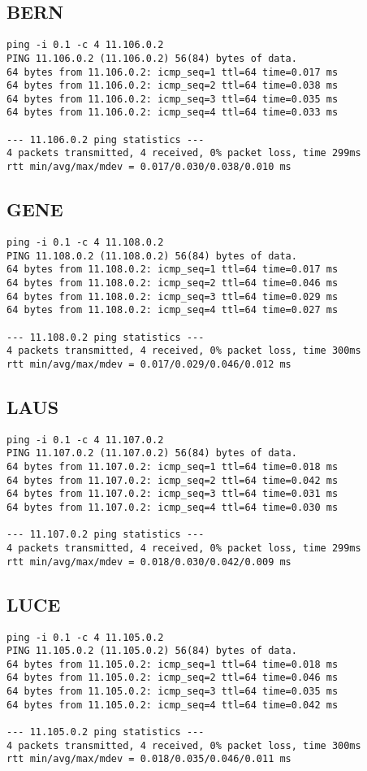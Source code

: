 \subsection{BERN}
\begin{lstlisting}
ping -i 0.1 -c 4 11.106.0.2
PING 11.106.0.2 (11.106.0.2) 56(84) bytes of data.
64 bytes from 11.106.0.2: icmp_seq=1 ttl=64 time=0.017 ms
64 bytes from 11.106.0.2: icmp_seq=2 ttl=64 time=0.038 ms
64 bytes from 11.106.0.2: icmp_seq=3 ttl=64 time=0.035 ms
64 bytes from 11.106.0.2: icmp_seq=4 ttl=64 time=0.033 ms

--- 11.106.0.2 ping statistics ---
4 packets transmitted, 4 received, 0% packet loss, time 299ms
rtt min/avg/max/mdev = 0.017/0.030/0.038/0.010 ms
\end{lstlisting}

\subsection{GENE}
\begin{lstlisting}
ping -i 0.1 -c 4 11.108.0.2
PING 11.108.0.2 (11.108.0.2) 56(84) bytes of data.
64 bytes from 11.108.0.2: icmp_seq=1 ttl=64 time=0.017 ms
64 bytes from 11.108.0.2: icmp_seq=2 ttl=64 time=0.046 ms
64 bytes from 11.108.0.2: icmp_seq=3 ttl=64 time=0.029 ms
64 bytes from 11.108.0.2: icmp_seq=4 ttl=64 time=0.027 ms

--- 11.108.0.2 ping statistics ---
4 packets transmitted, 4 received, 0% packet loss, time 300ms
rtt min/avg/max/mdev = 0.017/0.029/0.046/0.012 ms
\end{lstlisting}

\subsection{LAUS}
\begin{lstlisting}
ping -i 0.1 -c 4 11.107.0.2
PING 11.107.0.2 (11.107.0.2) 56(84) bytes of data.
64 bytes from 11.107.0.2: icmp_seq=1 ttl=64 time=0.018 ms
64 bytes from 11.107.0.2: icmp_seq=2 ttl=64 time=0.042 ms
64 bytes from 11.107.0.2: icmp_seq=3 ttl=64 time=0.031 ms
64 bytes from 11.107.0.2: icmp_seq=4 ttl=64 time=0.030 ms

--- 11.107.0.2 ping statistics ---
4 packets transmitted, 4 received, 0% packet loss, time 299ms
rtt min/avg/max/mdev = 0.018/0.030/0.042/0.009 ms
\end{lstlisting}

\subsection{LUCE}
\begin{lstlisting}
ping -i 0.1 -c 4 11.105.0.2
PING 11.105.0.2 (11.105.0.2) 56(84) bytes of data.
64 bytes from 11.105.0.2: icmp_seq=1 ttl=64 time=0.018 ms
64 bytes from 11.105.0.2: icmp_seq=2 ttl=64 time=0.046 ms
64 bytes from 11.105.0.2: icmp_seq=3 ttl=64 time=0.035 ms
64 bytes from 11.105.0.2: icmp_seq=4 ttl=64 time=0.042 ms

--- 11.105.0.2 ping statistics ---
4 packets transmitted, 4 received, 0% packet loss, time 300ms
rtt min/avg/max/mdev = 0.018/0.035/0.046/0.011 ms
\end{lstlisting}

